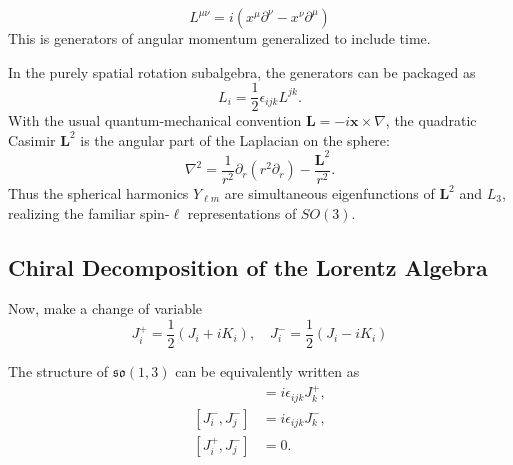 \begin{example}
    \begin{equation}
        L^{\mu \nu} = i \left( x^\mu \partial^\nu - x^\nu \partial^\mu \right)
    \end{equation}
    This is generators of angular momentum generalized to include time.
\end{example}
In the purely spatial rotation subalgebra, the generators can be packaged as
\[
    L_i = \frac{1}{2}\epsilon_{ijk}L^{jk}.
\]
With the usual quantum-mechanical convention $\mathbf{L}=-i\mathbf{x}\times\nabla$, the quadratic Casimir $\mathbf{L}^2$ is the angular part of the Laplacian on the sphere:
\[
    \nabla^2 = \frac{1}{r^2}\partial_r\left(r^2\partial_r\right) - \frac{\mathbf{L}^2}{r^2}.
\]
Thus the spherical harmonics $Y_{\ell m}$ are simultaneous eigenfunctions of $\mathbf{L}^2$ and $L_3$, realizing the familiar spin-$\ell$ representations of $SO(3)$.

\subsection{Chiral Decomposition of the Lorentz Algebra}
\label{subsec:chiral-decomposition-of-the-lorentz-algebra}

Now, make a change of variable
\begin{equation}
    J_i^+ = \frac{1}{2} (J_i + i K_i), \quad J_i^- = \frac{1}{2} (J_i - i K_i)
\end{equation}

The structure of $\mathfrak{so}(1,3)$ can be equivalently written as
\begin{align*}
    [J_i^+, J_j^+] &= i \epsilon_{ijk} J_k^+, \\
    [J_i^-, J_j^-] &= i \epsilon_{ijk} J_k^-, \\
    [J_i^+, J_j^-] &= 0.
\end{align*}

